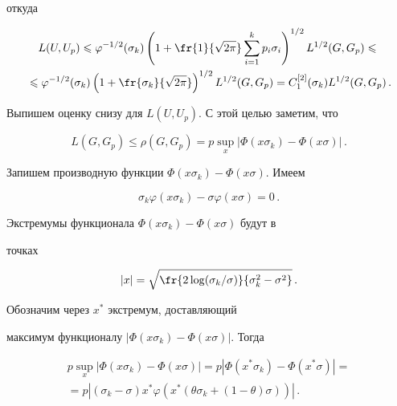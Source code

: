 откуда

\begin{multline*}

L(U,U_p)\leqslant\varphi^{-1/2}

(\sigma_k)\left(1+\fr{1}{\sqrt{2\pi}}\sum\limits_{i=1}^k

p_i\sigma_i\right)^{1/2}L^{1/2}(G,G_p)\leqslant{}\\

{}\leqslant\varphi^{-1/2}(\sigma_k)\left(1+\fr{\sigma_k}{\sqrt{2\pi}}

\right)^{1/2}L^{1/2}(G,G_p)=C_1^{[2]}(\sigma_k)L^{1/2}(G,G_p)\,.

\end{multline*}



Выпишем оценку снизу для $L(U,U_p)$. С этой целью заметим, что

$$

L(G,G_p)\leqslant\rho(G,G_p)=p\sup\limits_x|\Phi(x\sigma_k)-\Phi(x\sigma)|\,.

$$



Запишем производную функции $\Phi(x\sigma_k)-\Phi(x\sigma)$. Имеем

$$

\sigma_k\varphi(x\sigma_k)-\sigma\varphi(x\sigma)=0\,.

$$



Экстремумы функционала $\Phi(x\sigma_k)-\Phi(x\sigma)$ будут в

точках

$$

|x|=\sqrt{\fr{2\log(\sigma_k/\sigma)}{\sigma_k^2-\sigma^2}}\,.

$$



Обозначим через $x^*$ экстремум, доставляющий

максимум функционалу $|\Phi(x\sigma_k)-\Phi(x\sigma)|$. Тогда

\begin{multline*}

p\sup\limits_x|\Phi(x\sigma_k)-\Phi(x\sigma)|

=p|\Phi(x^*\sigma_k)-\Phi(x^{*}\sigma)|={}\\

{}=p|(\sigma_k-\sigma)x^*\varphi(x^*(\theta\sigma_k+(1-\theta)\sigma))|\,.

\end{multline*}



